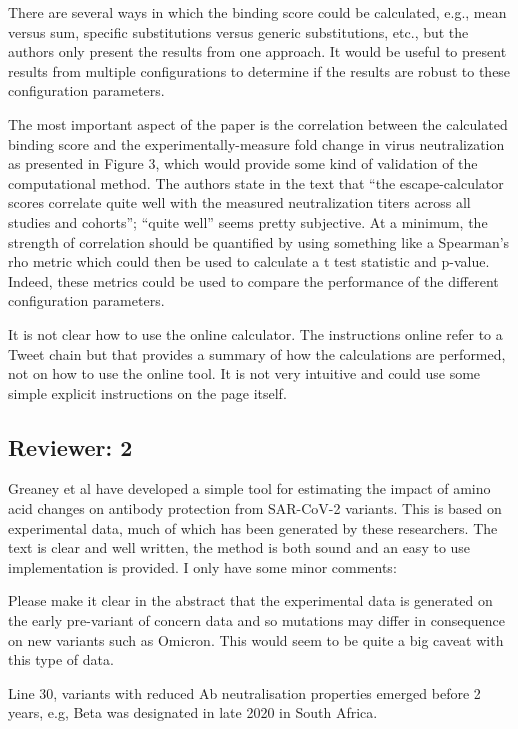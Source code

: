 \documentclass[11pt, oneside]{article}   	%
\begin{document}
There are several ways in which the binding score could be calculated, e.g., mean versus sum, specific substitutions versus generic substitutions, etc., but the authors only present the results from one approach.  It would be useful to present results from multiple configurations to determine if the results are robust to these configuration parameters.

The most important aspect of the paper is the correlation between the calculated binding score and the experimentally-measure fold change in virus neutralization as presented in Figure 3, which would provide some kind of validation of the computational method.  The authors state in the text that “the escape-calculator scores correlate quite well with the measured neutralization titers across all studies and cohorts”; “quite well” seems pretty subjective.  At a minimum, the strength of correlation should be quantified by using something like a Spearman’s rho metric which could then be used to calculate a t test statistic and p-value.  Indeed, these metrics could be used to compare the performance of the different configuration parameters.

It is not clear how to use the online calculator.  The instructions online refer to a Tweet chain but that provides a summary of how the calculations are performed, not on how to use the online tool.  It is not very intuitive and could use some simple explicit instructions on the page itself.

\subsection*{Reviewer: 2}

Greaney et al have developed a simple tool for estimating the impact of amino acid changes on antibody protection from SAR-CoV-2 variants. This is based on experimental data, much of which has been generated by these researchers. The text is clear and well written, the method is both sound and an easy to use implementation is provided. I only have some minor comments:

Please make it clear in the abstract that the experimental data is generated on the early pre-variant of concern data and so mutations may differ in consequence on new variants such as Omicron. This would seem to be quite a big caveat with this type of data.

Line 30, variants with reduced Ab neutralisation properties emerged before 2 years, e.g, Beta was designated in late 2020 in South Africa.
\end{document}
